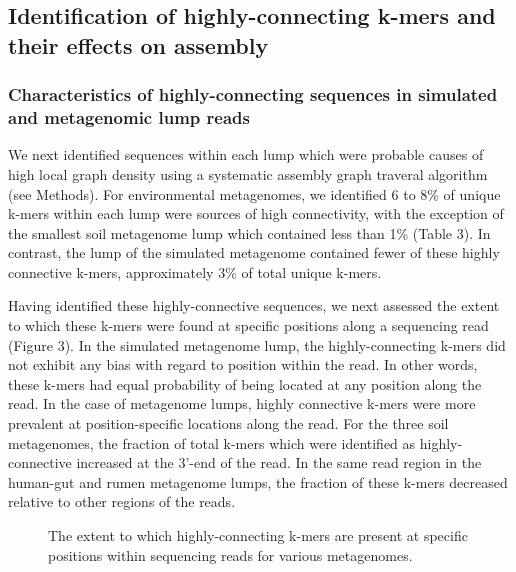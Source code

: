 \documentclass[11pt]{article} %
\begin{document}
\subsection{Identification of highly-connecting k-mers and their effects on assembly}

\subsubsection{Characteristics of highly-connecting sequences in simulated and metagenomic lump reads}

We next identified sequences within each lump which were probable causes of high local graph density using a systematic assembly graph traveral algorithm (see Methods).  For environmental metagenomes, we identified 6 to 8\% of unique k-mers within each lump were sources of high connectivity, with the exception of the smallest soil metagenome lump which contained less than 1\%  (Table 3).  In contrast, the lump of the simulated metagenome contained fewer of these highly connective k-mers, approximately 3\% of total unique k-mers.  

Having identified these highly-connective sequences, we next assessed the extent to which these k-mers were found at specific positions along a sequencing read (Figure 3).  In the simulated metagenome lump, the highly-connecting k-mers did not exhibit any bias with regard to position within the read.  In other words, these k-mers had equal probability of being located at any position along the read.  In the case of metagenome lumps, highly connective k-mers were more prevalent at position-specific locations along the read.   For the three soil metagenomes, the fraction of total k-mers which were identified as highly-connective increased at the 3'-end of the read.  In the same read region in the human-gut and rumen metagenome lumps, the fraction of these k-mers decreased relative to other regions of the reads.    

\begin{figure}
\caption{The extent to which highly-connecting k-mers are present at specific positions within sequencing reads for various metagenomes.}
\end{figure}
\end{document}

